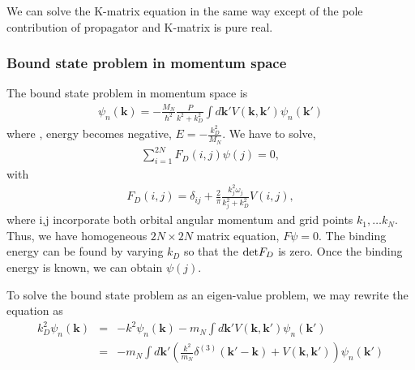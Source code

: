 \documentclass[10pt]{article}
\def\bm{\boldsymbol}
\newcommand{\bea}{\begin{eqnarray}}
\newcommand{\eea}{\end{eqnarray}}
\newcommand{\no}{\nonumber \\}
\def\vk{{\bm k}}
\begin{document}
We can solve the K-matrix equation in the same way except of the pole
contribution of propagator and K-matrix is pure real.

\subsubsection{Bound state problem in momentum space}
The bound state problem in momentum space is
\bea
\psi_n(\vk)=-\frac{M_N}{\hbar^2}\frac{P}{k^2+k_D^2}\int d\vk'
      V(\vk,\vk')\psi_n(\vk')
\eea
where , energy becomes negative, $E=-\frac{k_D^2}{M_N}$.
We have to solve,
\bea
\sum_{i=1}^{2N} F_D(i,j)\psi(j)=0,
\eea
with
\bea
F_D(i,j)=\delta_{ij}+\frac{2}{\pi}\frac{k_j^2 \omega_j}{k_j^2+k_D^2}
          V(i,j),
\eea
where i,j incorporate both orbital angular momentum and
grid points $k_{1},\dots k_N$. Thus, we have
homogeneous $2N\times 2N$ matrix equation, $F\psi=0$.
The binding energy can be found by varying $k_D$ so that the
${\rm det} F_D$ is zero. Once the binding energy is known, 
we can obtain $\psi(j)$.

To solve the bound state problem as an eigen-value problem,
we may rewrite the equation as
\bea 
k_D^2\psi_n(\vk)&=& -k^2 \psi_n(\vk)-m_N \int d\vk' V(\vk,\vk')\psi_n(\vk') \no 
        &=&-m_N \int d\vk'  \left( \frac{k^2}{m_N}\delta^{(3)}(\vk'-\vk)
            +V(\vk,\vk') \right) \psi_n(\vk')
\eea 

\newpage 
\end{document}
